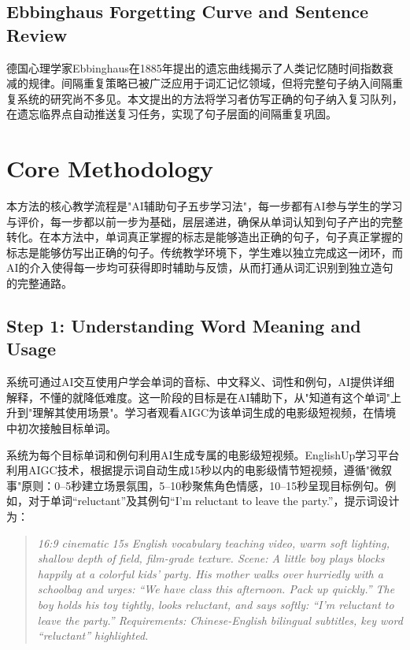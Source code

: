 \documentclass[Afour,sageapa,times]{sagej}
\begin{document}
\subsection{Ebbinghaus Forgetting Curve and Sentence Review}

德国心理学家Ebbinghaus在1885年提出的遗忘曲线揭示了人类记忆随时间指数衰减的规律\cite{ebbinghaus1885memory}。间隔重复策略已被广泛应用于词汇记忆领域，但将完整句子纳入间隔重复系统的研究尚不多见。本文提出的方法将学习者仿写正确的句子纳入复习队列，在遗忘临界点自动推送复习任务，实现了句子层面的间隔重复巩固。


\section{Core Methodology}  %

本方法的核心教学流程是"AI辅助句子五步学习法"，每一步都有AI参与学生的学习与评价，每一步都以前一步为基础，层层递进，确保从单词认知到句子产出的完整转化。在本方法中，单词真正掌握的标志是能够造出正确的句子，句子真正掌握的标志是能够仿写出正确的句子。传统教学环境下，学生难以独立完成这一闭环，而AI的介入使得每一步均可获得即时辅助与反馈，从而打通从词汇识别到独立造句的完整通路。

\subsection{Step 1: Understanding Word Meaning and Usage}
系统可通过AI交互使用户学会单词的音标、中文释义、词性和例句，AI提供详细解释，不懂的就降低难度。这一阶段的目标是在AI辅助下，从"知道有这个单词"上升到"理解其使用场景"。学习者观看AIGC为该单词生成的电影级短视频，在情境中初次接触目标单词。

系统为每个目标单词和例句利用AI生成专属的电影级短视频。EnglishUp学习平台利用AIGC技术，根据提示词自动生成15秒以内的电影级情节短视频，遵循"微叙事"原则：0--5秒建立场景氛围，5--10秒聚焦角色情感，10--15秒呈现目标例句。例如，对于单词``reluctant''及其例句``I'm reluctant to leave the party.''，提示词设计为：

\begin{quote}\small
\textit{16:9 cinematic 15s English vocabulary teaching video, warm soft lighting, shallow depth of field, film-grade texture. Scene: A little boy plays blocks happily at a colorful kids' party. His mother walks over hurriedly with a schoolbag and urges: ``We have class this afternoon. Pack up quickly.'' The boy holds his toy tightly, looks reluctant, and says softly: ``I'm reluctant to leave the party.'' Requirements: Chinese-English bilingual subtitles, key word ``reluctant'' highlighted.}
\end{quote}
\end{document}
